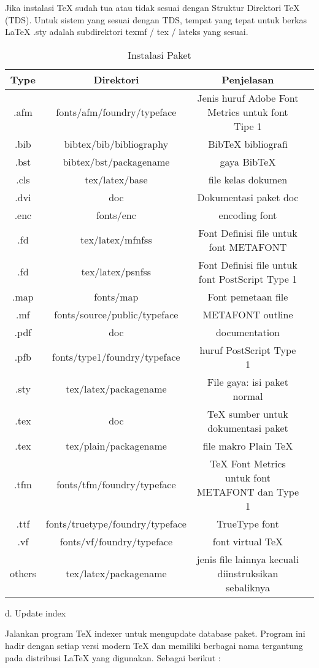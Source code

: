 \vspace{8pt}
Jika instalasi TeX sudah tua atau tidak sesuai dengan Struktur Direktori TeX (TDS). Untuk sistem yang sesuai dengan TDS, tempat yang tepat untuk berkas LaTeX .sty adalah subdirektori texmf / tex / lateks yang sesuai.\par

\begin{table}[ht]
	\caption{Instalasi Paket}
	\centering
	\begin{tabular}{cccc}
		\hline
		Type&Direktori&Penjelasan&\\
		\hline
		.afm&fonts/afm/foundry/typeface&Jenis huruf Adobe Font Metrics untuk font Tipe 1&\\
		.bib&bibtex/bib/bibliography&BibTeX bibliografi&\\
		.bst&bibtex/bst/packagename& gaya BibTeX&\\
		.cls&tex/latex/base& file kelas dokumen&\\
		.dvi&doc&Dokumentasi paket doc&\\
		.enc&fonts/enc&encoding font&\\
		.fd&tex/latex/mfnfss&Font Definisi file untuk font METAFONT&\\
		.fd&tex/latex/psnfss& Font Definisi file untuk font PostScript Type 1&\\
		.map&fonts/map&Font pemetaan file&\\
		.mf&fonts/source/public/typeface&METAFONT outline&\\
		.pdf&doc&documentation&\\
		.pfb&fonts/type1/foundry/typeface&huruf PostScript Type 1&\\
		.sty&tex/latex/packagename&File gaya: isi paket normal&\\
		.tex&doc&TeX sumber untuk dokumentasi paket&\\
		.tex&tex/plain/packagename&file makro Plain TeX&\\
		.tfm&fonts/tfm/foundry/typeface&TeX Font Metrics untuk font METAFONT dan Type 1&\\
		.ttf&fonts/truetype/foundry/typeface&TrueType font&\\
		.vf&fonts/vf/foundry/typeface&font virtual TeX&\\
	    others&tex/latex/packagename&jenis file lainnya kecuali diinstruksikan sebaliknya&\\		
		\hline
	\end{tabular}
\end{table}

\vspace{8pt}
\noindent d. Update index  \par
Jalankan program TeX indexer untuk mengupdate database paket. Program ini hadir dengan setiap versi modern TeX dan memiliki berbagai nama tergantung pada distribusi LaTeX yang digunakan. Sebagai berikut :\par

